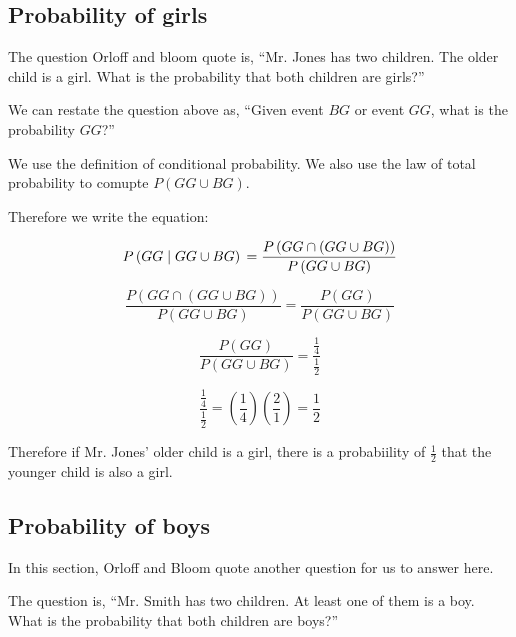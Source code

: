 \documentclass[a4paper,11pt]{article}
\begin{document}
\subsection{Probability of girls}
The question Orloff and bloom quote is, ``Mr. Jones has two children. The
older child is a girl. What is the probability that both children are
girls?''

We can restate the question above as,  ``Given event $BG$
or event $GG$, what is the probability $GG$?'' 

We use the definition of conditional probability. We also use the law of
total probability to comupte $P \left( GG \cup BG \right)$.

Therefore we write the equation:

\begin{equation}
P \left( GG \mid GG \cup BG \right) \\
 = \frac{ P \left( GG \cap \left( GG \cup BG \right) \right)}
  {P \left( GG \cup BG \right)}
\end{equation}

\begin{equation}
\frac{ P \left( GG \cap \left( GG \cup BG \right) \right)}
  {P \left( GG \cup BG \right)}
 = \frac{ P \left( GG \right) }
  {P \left( GG \cup BG \right)}
\end{equation}

\begin{equation}
 \frac{ P \left( GG \right) }
  {P \left( GG \cup BG \right)}
= \frac { \frac{1}{4} }
{ \frac{1}{2} }
\end{equation}

\begin{equation}
\frac { \frac{1}{4} }
{ \frac{1}{2} }
= \left( \frac{1}{4} \right) \left( \frac{2}{1} \right)
=\frac{1}{2}
\end{equation}

Therefore if Mr. Jones' older child is a girl, there is a 
probabiility of $\frac{1}{2}$ that the younger child is also a girl.


\subsection{Probability of boys}

In this section, Orloff and Bloom quote another question for us to 
answer here.

The question is, ``Mr. Smith has two children. At least one of them is a
boy. What is the probability that both children are boys?''
\end{document}

